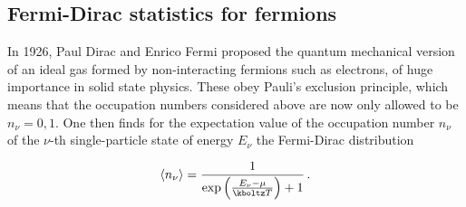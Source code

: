 \subsection*{Fermi-Dirac statistics for fermions}

In 1926, Paul Dirac and Enrico Fermi proposed the quantum mechanical version of an ideal gas formed by non-interacting fermions such as electrons, of huge importance in solid state physics. These obey Pauli's exclusion principle, which means that the occupation numbers considered above are now only allowed to be $n_\nu=0,1$. One then finds for the expectation value of the occupation number $n_\nu$ of the $\nu$-th single-particle state of energy $E_\nu$ the Fermi-Dirac distribution

\begin{equation*}
  \langle n_\nu \rangle=
    \frac{1}{\exp\left(\frac{E_\nu-\mu}{\kboltz T} \right)+1}\,.
\end{equation*}
